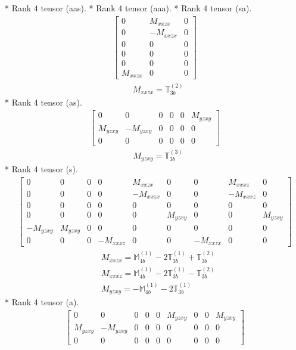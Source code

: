\documentclass[fleqn,8pt,landscape]{jsarticle}
\begin{document}
* Rank 4 tensor (aas).
* Rank 4 tensor (aaa).
* Rank 4 tensor (sa).
\begin{align*}
\begin{bmatrix} 0 & M_{xxzx} & 0 \\ 0 & - M_{xxzx} & 0 \\ 0 & 0 & 0 \\ 0 & 0 & 0 \\ 0 & 0 & 0 \\ M_{xxzx} & 0 & 0 \end{bmatrix}
\end{align*}
\begin{align*}
& M_{xxzx} = \mathbb{T}_{3b}^{(2)}
\end{align*}
* Rank 4 tensor (as).
\begin{align*}
\begin{bmatrix} 0 & 0 & 0 & 0 & 0 & M_{yzxy} \\ M_{yzxy} & - M_{yzxy} & 0 & 0 & 0 & 0 \\ 0 & 0 & 0 & 0 & 0 & 0 \end{bmatrix}
\end{align*}
\begin{align*}
& M_{yzxy} = \mathbb{T}_{3b}^{(3)}
\end{align*}
* Rank 4 tensor (s).
\begin{align*}
\begin{bmatrix} 0 & 0 & 0 & 0 & M_{xxzx} & 0 & 0 & M_{xxxz} & 0 \\ 0 & 0 & 0 & 0 & - M_{xxzx} & 0 & 0 & - M_{xxxz} & 0 \\ 0 & 0 & 0 & 0 & 0 & 0 & 0 & 0 & 0 \\ 0 & 0 & 0 & 0 & 0 & M_{yzxy} & 0 & 0 & M_{yzxy} \\ - M_{yzxy} & M_{yzxy} & 0 & 0 & 0 & 0 & 0 & 0 & 0 \\ 0 & 0 & 0 & - M_{xxxz} & 0 & 0 & - M_{xxzx} & 0 & 0 \end{bmatrix}
\end{align*}
\begin{align*}
& M_{xxzx} = \mathbb{M}_{4b}^{(1)} - 2 \mathbb{T}_{3b}^{(1)} + \mathbb{T}_{3b}^{(2)} \\
& M_{xxxz} = \mathbb{M}_{4b}^{(1)} - 2 \mathbb{T}_{3b}^{(1)} - \mathbb{T}_{3b}^{(2)} \\
& M_{yzxy} = - \mathbb{M}_{4b}^{(1)} - 2 \mathbb{T}_{3b}^{(1)}
\end{align*}
* Rank 4 tensor (a).
\begin{align*}
\begin{bmatrix} 0 & 0 & 0 & 0 & 0 & M_{yzxy} & 0 & 0 & M_{yzxy} \\ M_{yzxy} & - M_{yzxy} & 0 & 0 & 0 & 0 & 0 & 0 & 0 \\ 0 & 0 & 0 & 0 & 0 & 0 & 0 & 0 & 0 \end{bmatrix}
\end{align*}
\end{document}
